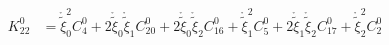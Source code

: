 \begin{equation}
\begin{aligned}
K^0_{22} &= \mathring{\widetilde{\xi}}_0^{2} {C^{0}_{4}} + 2 \mathring{\widetilde{\xi}}_0 \mathring{\widetilde{\xi}}_1 {C^{0}_{20}} + 2 \mathring{\widetilde{\xi}}_0 \mathring{\widetilde{\xi}}_2 {C^{0}_{16}} + \mathring{\widetilde{\xi}}_1^{2} {C^{0}_{5}} + 2 \mathring{\widetilde{\xi}}_1 \mathring{\widetilde{\xi}}_2 {C^{0}_{17}} + \mathring{\widetilde{\xi}}_2^{2} {C^{0}_{2}}\\
\end{aligned}\end{equation}

